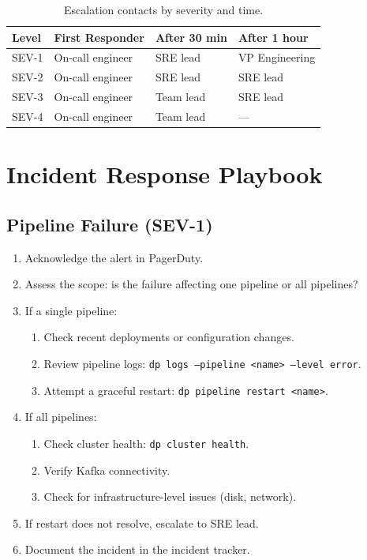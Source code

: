 \documentclass[
    language=english,
    doctype=manual,
    institution=none,
    titlestyle=book,
    oneside,
]{omnilatex}
\begin{document}
\begin{table}[htbp]
    \centering
    \caption{Escalation contacts by severity and time.}
    \label{tab:escalation}
    \begin{tabular}{@{}llll@{}}
        \toprule
        Level & First Responder & After 30 min & After 1 hour \\
        \midrule
        SEV-1 & On-call engineer & SRE lead & VP Engineering \\
        SEV-2 & On-call engineer & SRE lead & SRE lead \\
        SEV-3 & On-call engineer & Team lead & SRE lead \\
        SEV-4 & On-call engineer & Team lead & --- \\
        \bottomrule
    \end{tabular}
\end{table}

\section{Incident Response Playbook}

\subsection{Pipeline Failure (SEV-1)}

\begin{enumerate}
    \item Acknowledge the alert in PagerDuty.
    \item Assess the scope: is the failure affecting one pipeline or all
        pipelines?
    \item If a single pipeline:
    \begin{enumerate}
        \item Check recent deployments or configuration changes.
        \item Review pipeline logs: \texttt{dp logs --pipeline <name> --level error}.
        \item Attempt a graceful restart: \texttt{dp pipeline restart <name>}.
    \end{enumerate}
    \item If all pipelines:
    \begin{enumerate}
        \item Check cluster health: \texttt{dp cluster health}.
        \item Verify Kafka connectivity.
        \item Check for infrastructure-level issues (disk, network).
    \end{enumerate}
    \item If restart does not resolve, escalate to SRE lead.
    \item Document the incident in the incident tracker.
\end{enumerate}
\end{document}
